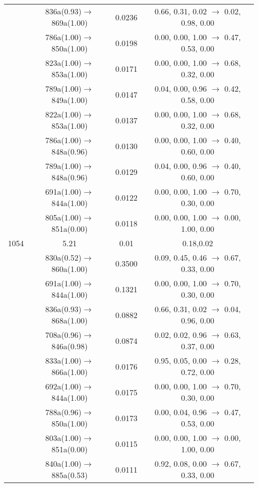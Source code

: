 \documentclass[10pt,a4paper]{article}
\begin{document}
\begin{longtable}{c|c|c|c}
 	& 836a(0.93)$\rightarrow$869a(1.00) &	 0.0236 &	 0.66, 0.31, 0.02 $\rightarrow$ 0.02, 0.98, 0.00 \\ 
 	& 786a(1.00)$\rightarrow$850a(1.00) &	 0.0198 &	 0.00, 0.00, 1.00 $\rightarrow$ 0.47, 0.53, 0.00 \\ 
 	& 823a(1.00)$\rightarrow$853a(1.00) &	 0.0171 &	 0.00, 0.00, 1.00 $\rightarrow$ 0.68, 0.32, 0.00 \\ 
 	& 789a(1.00)$\rightarrow$849a(1.00) &	 0.0147 &	 0.04, 0.00, 0.96 $\rightarrow$ 0.42, 0.58, 0.00 \\ 
 	& 822a(1.00)$\rightarrow$853a(1.00) &	 0.0137 &	 0.00, 0.00, 1.00 $\rightarrow$ 0.68, 0.32, 0.00 \\ 
 	& 786a(1.00)$\rightarrow$848a(0.96) &	 0.0130 &	 0.00, 0.00, 1.00 $\rightarrow$ 0.40, 0.60, 0.00 \\ 
 	& 789a(1.00)$\rightarrow$848a(0.96) &	 0.0129 &	 0.04, 0.00, 0.96 $\rightarrow$ 0.40, 0.60, 0.00 \\ 
 	& 691a(1.00)$\rightarrow$844a(1.00) &	 0.0122 &	 0.00, 0.00, 1.00 $\rightarrow$ 0.70, 0.30, 0.00 \\ 
 	& 805a(1.00)$\rightarrow$851a(0.00) &	 0.0118 &	 0.00, 0.00, 1.00 $\rightarrow$ 0.00, 1.00, 0.00 \\ 
 \hline1054 &	 5.21 &	 0.01 &	 0.18,0.02 \\ 
  	& 830a(0.52)$\rightarrow$860a(1.00) &	 0.3500 &	 0.09, 0.45, 0.46 $\rightarrow$ 0.67, 0.33, 0.00 \\ 
 	& 691a(1.00)$\rightarrow$844a(1.00) &	 0.1321 &	 0.00, 0.00, 1.00 $\rightarrow$ 0.70, 0.30, 0.00 \\ 
 	& 836a(0.93)$\rightarrow$868a(1.00) &	 0.0882 &	 0.66, 0.31, 0.02 $\rightarrow$ 0.04, 0.96, 0.00 \\ 
 	& 708a(0.96)$\rightarrow$846a(0.98) &	 0.0874 &	 0.02, 0.02, 0.96 $\rightarrow$ 0.63, 0.37, 0.00 \\ 
 	& 833a(1.00)$\rightarrow$866a(1.00) &	 0.0176 &	 0.95, 0.05, 0.00 $\rightarrow$ 0.28, 0.72, 0.00 \\ 
 	& 692a(1.00)$\rightarrow$844a(1.00) &	 0.0175 &	 0.00, 0.00, 1.00 $\rightarrow$ 0.70, 0.30, 0.00 \\ 
 	& 788a(0.96)$\rightarrow$850a(1.00) &	 0.0173 &	 0.00, 0.04, 0.96 $\rightarrow$ 0.47, 0.53, 0.00 \\ 
 	& 803a(1.00)$\rightarrow$851a(0.00) &	 0.0115 &	 0.00, 0.00, 1.00 $\rightarrow$ 0.00, 1.00, 0.00 \\ 
 	& 840a(1.00)$\rightarrow$885a(0.53) &	 0.0111 &	 0.92, 0.08, 0.00 $\rightarrow$ 0.67, 0.33, 0.00 \\ 

\end{longtable}
\end{document}
